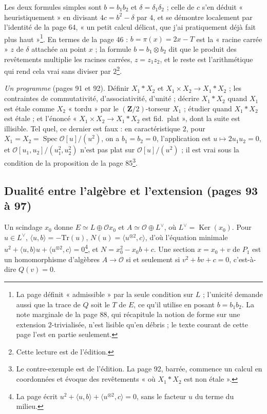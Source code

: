 \documentclass[11pt,a4paper]{article}
\begin{document}
Les deux formules simples sont $b = b_1b_2$ et $\delta = \delta_1\delta_2$ ; celle de $c$
s'en déduit « heuristiquement » en divisant $4c = b^{2} - \delta$ par $4$, et se
démontre localement par l'identité de la page 64, « un petit calcul délicat, que
j'ai pratiquement déjà fait plus haut »\footnote{La page définit « admissible » par
la seule condition sur $L$ ; l'unicité demande aussi que la trace de $Q$ soit le
$T$ de $E$, ce qu'il utilise en posant $b = b_1b_2$. La note marginale de la page
88, qui récapitule la notion de forme sur une extension $2$-trivialisée, n'est lisible
qu'en débris ; le texte courant de cette page l'est en partie seulement.}. En
termes de la page 46 : $b = \pi(x) = 2x - T$ est la « racine carrée » $z$ de
$\delta$ attachée au point $x$ ; la formule $b = b_1 \otimes b_2$ dit que le produit des
revêtements multiplie les racines carrées, $z = z_1z_2$, et le reste est l'arithmétique
qui rend cela vrai sans diviser par $2$\footnote{Cette lecture est de l'édition.}.

\emph{Un programme} (pages 91 et 92). Définir $X_1 * X_2$ et $X_1 \times X_2 \to X_1 * X_2$ ;
les contraintes de commutativité, d'associativité, d'unité ; décrire $X_1 * X_2$
quand $X_1$ est étale comme $X_2$ « tordu » par le $(\mathbf{Z}/2)$-torseur $X_1$ ;
étudier quand $X_1 * X_2$ est étale ; et l'énoncé « $X_1 \times X_2 \to X_1 * X_2$ est
fid.\ plat », dont la suite est illisible. Tel quel, ce dernier est faux : en
caractéristique $2$, pour $X_1 = X_2 = \operatorname{Spec}\mathcal{O}[u]/(u^{2})$, on a
$b_1 = b_2 = 0$, l'application est $u \mapsto 2u_1u_2 = 0$, et
$\mathcal{O}[u_1, u_2]/(u_1^{2}, u_2^{2})$ n'est pas plat sur $\mathcal{O}[u]/(u^{2})$ ;
il est vrai sous la condition de la proposition de la page 85\footnote{Le
contre-exemple est de l'édition. La page 92, barrée, commence un calcul en
coordonnées et évoque des revêtements « où $X_1 * X_2$ est non étale ».}.

\subsection*{Dualité entre l'algèbre et l'extension (pages 93 à 97)}

Un scindage $x_0$ donne $E \simeq L \oplus \mathcal{O}x_0$ et $A \simeq \mathcal{O} \oplus
L^{\vee}$, où $L^{\vee} = \operatorname{Ker}(x_0)$. Pour $u \in L^{\vee}$, $\langle u, b\rangle
= -\mathrm{Tr}(u)$, $N(u) = \langle u^{\otimes 2}, c\rangle$, d'où l'équation minimale
$u^{2} + \langle u, b\rangle u + \langle u^{\otimes 2}, c\rangle = 0$\footnote{La page
écrit $u^{2} + \langle u, b\rangle + \langle u^{\otimes 2}, c\rangle = 0$, sans le facteur
$u$ du terme du milieu.}, et $N = x_0^{2} - x_0b + c$. Une section $x = x_0 + v$ de
$P_1$ est un homomorphisme d'algèbres $A \to \mathcal{O}$ si et seulement si
$v^{2} + bv + c = 0$, c'est-à-dire $Q(v) = 0$.
\end{document}
